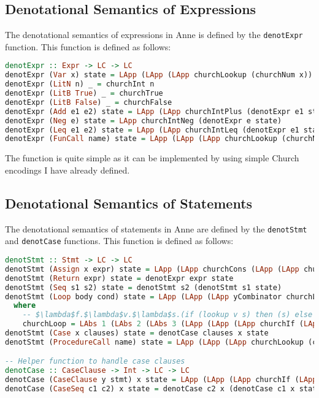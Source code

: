 \subsection{Denotational Semantics of Expressions}

The denotational semantics of expressions in Anne is defined by the \texttt{denotExpr} function. This function is defined as follows:

\begin{lstlisting}[language=Haskell]
denotExpr :: Expr -> LC -> LC
denotExpr (Var x) state = LApp (LApp (LApp churchLookup (churchNum x)) state) state
denotExpr (LitN n) _ = churchInt n
denotExpr (LitB True) _ = churchTrue
denotExpr (LitB False) _ = churchFalse
denotExpr (Add e1 e2) state = LApp (LApp churchIntPlus (denotExpr e1 state)) (denotExpr e2 state)
denotExpr (Neg e) state = LApp churchIntNeg (denotExpr e state)
denotExpr (Leq e1 e2) state = LApp (LApp churchIntLeq (denotExpr e1 state)) (denotExpr e2 state)
denotExpr (FunCall name) state = LApp (LApp (LApp churchLookup (churchNum name)) state) state
\end{lstlisting}

The function is quite simple as it can be implemented by using simple Church encodings I have already defined.

\subsection{Denotational Semantics of Statements}

The denotational semantics of statements in Anne are defined by the \texttt{denotStmt} and \texttt{denotCase} functions. This function is defined as follows:

\begin{lstlisting}[language=Haskell]
denotStmt :: Stmt -> LC -> LC
denotStmt (Assign x expr) state = LApp (LApp churchCons (LApp (LApp churchPair (churchNum x)) (LAbs 0 (denotExpr expr state)))) state
denotStmt (Return expr) state = denotExpr expr state
denotStmt (Seq s1 s2) state = denotStmt s2 (denotStmt s1 state)
denotStmt (Loop body cond) state = LApp (LApp (LApp yCombinator churchLoop) (churchNum cond)) state
  where
    -- $\lambda$f.$\lambda$v.$\lambda$s.(if (lookup v s) then (s) else ({f v (result of b)})
    churchLoop = LAbs 1 (LAbs 2 (LAbs 3 (LApp (LApp (LApp churchIf (LApp (LApp (LApp churchLookup (LVar 2)) (LVar 3)) (LVar 3))) (LVar 3)) (LApp (LApp (LVar 1) (LVar 2)) (denotStmt body (LVar 3))))))
denotStmt (Case x clauses) state = denotCase clauses x state
denotStmt (ProcedureCall name) state = LApp (LApp (LApp churchLookup (churchNum name)) state) state

-- Helper function to handle case clauses
denotCase :: CaseClause -> Int -> LC -> LC
denotCase (CaseClause y stmt) x state = LApp (LApp (LApp churchIf (LApp (LApp churchIntEq (LApp (LApp (LApp churchLookup (churchNum x)) state) state)) (LApp (LApp (LApp churchLookup (churchNum y)) state) state))) (denotStmt stmt state)) state
denotCase (CaseSeq c1 c2) x state = denotCase c2 x (denotCase c1 x state)
\end{lstlisting}

